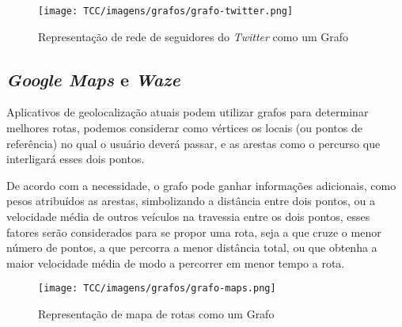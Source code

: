     \begin{figure}[H]
         \centering
         \texttt{[image: TCC/imagens/grafos/grafo-twitter.png]}
         \caption{Representação de rede de seguidores do \textit{Twitter} como um Grafo}
         \label{grafo-twitter}
    \end{figure}
    
    
    
    \subsection{\textit{Google Maps} e \textit{Waze}}
    
Aplicativos de geolocalização atuais podem utilizar grafos para determinar melhores rotas, podemos considerar como vértices os locais (ou pontos de referência) no qual o usuário deverá passar, e as arestas como o percurso que interligará esses dois pontos.

De acordo com a necessidade, o grafo pode ganhar informações adicionais, como pesos atribuídos as arestas, simbolizando a distância entre dois pontos, ou a velocidade média de outros veículos na travessia entre os dois pontos, esses fatores serão considerados para se propor uma rota, seja a que cruze o menor número de pontos, a que percorra a menor distância total, ou que obtenha a maior velocidade média de modo a percorrer em menor tempo a rota.
    
    \begin{figure}[H]
         \centering
         \texttt{[image: TCC/imagens/grafos/grafo-maps.png]}
         \caption{Representação de mapa de rotas como um Grafo}
         \label{Representação de gráfica de um grafo}
    \end{figure}
 
    
    

    
    




    
    
